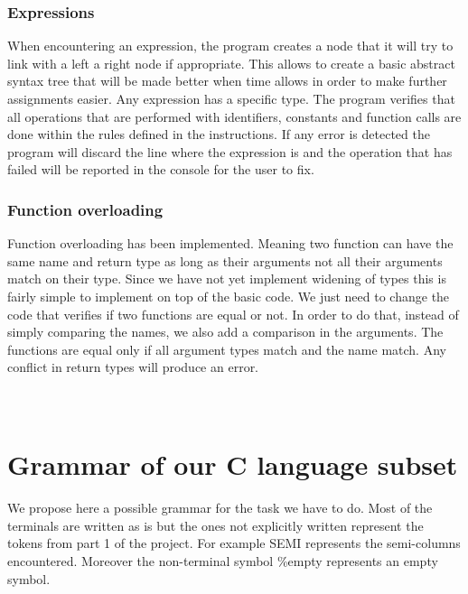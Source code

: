 \documentclass{article}
\begin{document}
\subsubsection{Expressions}
When encountering an expression, the program creates a node that it will try to link with a left a right node if appropriate. This allows to create a basic abstract syntax tree that will be made better when time allows in order to make further assignments easier. 
Any expression has a specific type. The program verifies that all operations that are performed with identifiers, constants and function calls are done within the rules defined in the instructions. 
If any error is detected the program will discard the line where the expression is and the operation that has failed will be reported in the console for the user to fix. 

\subsubsection{Function overloading}
Function overloading has been implemented. Meaning two function can have the same name and return type as long as their arguments not all their arguments match on their type. Since we have not yet implement widening of types this is fairly simple to implement on top of the basic code. We just need to change the code that verifies if two functions are equal or not. In order to do that, instead of simply comparing the names, we also add a comparison in the arguments. The functions are equal only if all argument types match and the name match. Any conflict in return types will produce an error. 


























\appendix
\section{\\Grammar of our C language subset}
\label{grammar}
We propose here a possible grammar for the task we have to do. Most of the terminals are written as is but the ones not explicitly written represent the tokens from part 1 of the project. For example {\sc SEMI} represents the semi-columns encountered. Moreover the non-terminal symbol {\%empty} represents an empty symbol. 
\end{document}
